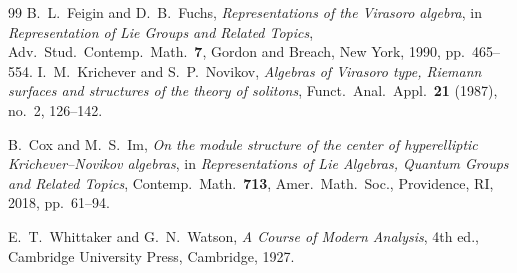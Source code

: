 \documentclass[12pt]{amsart}
\theoremstyle{plain}
\theoremstyle{definition}
\begin{document}
\begin{thebibliography}{99}
B.~L.~Feigin and D.~B.~Fuchs,
\textit{Representations of the Virasoro algebra},
in \textit{Representation of Lie Groups and Related Topics},
Adv.\ Stud.\ Contemp.\ Math.\ \textbf{7},
Gordon and Breach, New York, 1990, pp.~465--554.
I.~M.~Krichever and S.~P.~Novikov,
\textit{Algebras of Virasoro type, Riemann surfaces and structures of
  the theory of solitons},
Funct.\ Anal.\ Appl.\ \textbf{21} (1987), no.~2, 126--142.

B.~Cox and M.~S.~Im,
\textit{On the module structure of the center of hyperelliptic
  Krichever--Novikov algebras},
in \textit{Representations of Lie Algebras, Quantum Groups and Related
  Topics}, Contemp.\ Math.\ \textbf{713}, Amer.\ Math.\ Soc.,
Providence, RI, 2018, pp.~61--94.

E.~T.~Whittaker and G.~N.~Watson,
\textit{A Course of Modern Analysis},
4th ed., Cambridge University Press, Cambridge, 1927.

\end{thebibliography}
\end{document}
